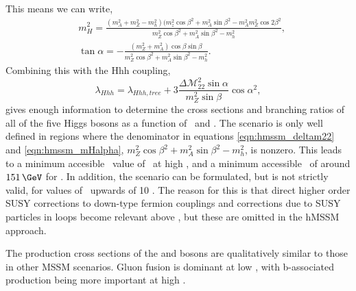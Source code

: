 This means we can write,
\begin{equation}
\label{eqn:hmssm_mHalpha}
\begin{split}
&m^2_H = \frac{(m_A^2+m_Z^2-m_h^2)(m_z^2\cos{\beta}^2+m_A^2\sin{\beta}^2 - m_A^2m_Z^2\cos{2\beta}^2}{m_Z^2\cos{\beta}^2+m_A^2\sin{\beta}^2-m_h^2},\\
&\tan{\alpha} = -\frac{(m_Z^2+m_A^2)\cos{\beta}\sin{\beta}}{m_Z^2\cos{\beta}^2+m_A^2\sin{\beta}^2-m_h^2}.
\end{split}
\end{equation}
Combining this with the Hhh coupling,
\begin{equation}
\label{eqn:hmssm_Hhh}
\lambda_{Hhh} = \lambda_{Hhh,tree} + 3\frac{\Delta\mathcal{M}^2_{22}\sin{\alpha}}{m_Z^2\sin{\beta}}\cos{\alpha}^2,
\end{equation}
gives enough information to determine the cross sections and branching
ratios of all of the five Higgs bosons as a function of \mA~and \tanb. The scenario
is only well defined in regions where the denominator in equations
\ref{eqn:hmssm_deltam22} and \ref{eqn:hmssm_mHalpha}, $m_Z^2\cos{\beta}^2+m_A^2\sin{\beta}^2 - m_h^2$, is nonzero. 
This leads to a minimum accesible \mA~value of \mh~at high \tanb, and
a minimum accessible \mA~of around $151\,\GeV$ for . In addition, the scenario
can be formulated, but is not strictly valid, for values of \tanb~upwards of 10 \cite{CMS-PAS-HIG-16-007}.
The reason for this is that direct higher order SUSY corrections to down-type
fermion couplings and corrections due to SUSY particles in loops become relevant
above , but these are omitted in the hMSSM approach.


The production cross sections of the \PHiggs and \PHiggsps bosons are
qualitatively similar to those in other \ac{MSSM} scenarios. Gluon fusion is dominant
at low \tanb, with b-associated production being more important at high \tanb. 

